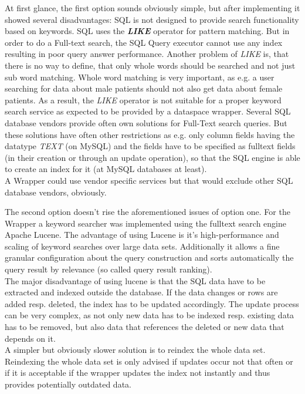 At first glance, the first option sounds obviously simple, but after implementing it showed several disadvantages: SQL is not designed to provide search functionality based on keywords. SQL uses the \textbf{\emph{LIKE}} operator for pattern matching. But in order to do a Full-text search, the SQL Query executor cannot use any index resulting in poor query answer performance. Another problem of \emph{LIKE} is, that there is no way to define, that only whole words should be searched and not just sub word matching. Whole word matching is very important, as e.g. a user searching for data about male patients should not also get data about female patients.
As a result, the \emph{LIKE} operator is not suitable for a proper keyword search service as expected to be provided by a dataspace wrapper. Several SQL database vendors provide often own solutions for Full-Text search queries. But these solutions have often other restrictions as e.g. only column fields having the datatype \emph{TEXT} (on MySQL) and the fields have to be specified as fulltext fields (in their creation or through an update operation), so that the SQL engine is able to create an index for it (at MySQL databases at least).\\
A Wrapper could use vendor specific services but that would exclude other SQL database vendors, obviously.

The second option doesn't rise the aforementioned issues of option one. For the Wrapper a keyword searcher was implemented using the fulltext search engine Apache Lucene. The advantage of using Lucene is it's high-performance and scaling of keyword searches over large data sets. Additionally it allows a fine granular configuration about the query construction and sorts automatically the query result by relevance (so called query result ranking). \\
The major disadvantage of using lucene is that the SQL data have to be extracted and indexed outside the database. If the data changes or rows are added resp. deleted, the index has to be updated accordingly. The update process can be very complex, as not only new data has to be indexed resp. existing data has to be removed, but also data that references the deleted or new data that depends on it.\\
A simpler but obviously slower solution is to reindex the whole data set. Reindexing the whole data set is only advised if updates occur not that often or if it is acceptable if the wrapper updates the index not instantly and thus provides potentially outdated data.

